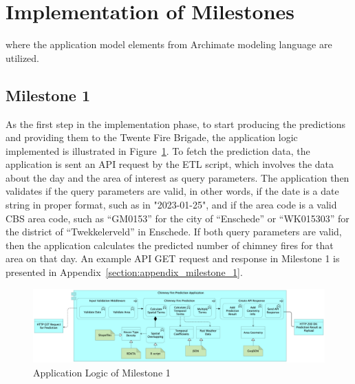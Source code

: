 \documentclass{utitcphd_overleaf}
\begin{document}


\section{Implementation of Milestones}

where the application model elements from Archimate modeling language are utilized.

\subsection{Milestone 1}

As the first step in the implementation phase, to start producing the predictions and providing them to the Twente Fire Brigade, the application logic implemented is illustrated in Figure~\ref{fig:m1_logic}. To fetch the prediction data, the application is sent an API request by the ETL script, which involves the data about the day and the area of interest as query parameters. The application then validates if the query parameters are valid, in other words, if the date is a date string in proper format, such as in "2023-01-25", and if the area code is a valid CBS area code, such as “GM0153” for the city of “Enschede” or “WK015303” for the district of “Twekkelerveld” in Enschede. If both query parameters are valid, then the application calculates the predicted number of chimney fires for that area on that day. An example API GET request and response in Milestone 1 is presented in Appendix~\ref{section:appendix_milestone_1}.

\begin{figure}[ht]
  \centering
  \includegraphics[width=1\textwidth]{my_images/milestones/m1.pdf}
  \caption{Application Logic of Milestone 1}
  \label{fig:m1_logic}
\end{figure}
\end{document}
